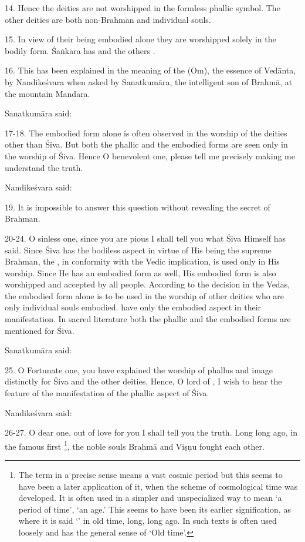 14. Hence the deities are not worshipped in the formless phallic symbol.
The other deities are both non-Brahman and individual souls.

15. In view of their being embodied alone they are worshipped solely in the
bodily form. Śaṅkara has  and the others .

16. This has been explained in the meaning of the  (Om), the essence
of Vedānta, by Nandikeśvara when asked by Sanatkumāra, the intelligent son of
Brahmā, at the mountain Mandara.

Sanatkumāra said:

17-18. The embodied form alone is often observed in the worship of the deities
other than Śiva. But both the phallic and the embodied forms are seen only in
the worship of Śiva. Hence O benevolent one, please tell me precisely making me
understand the truth.

Nandikeśvara said:

19. It is impossible to answer this question without revealing the secret of
Brahman.

20-24. O sinless one, since you are pious I shall tell you what Śiva Himself has
said. Since Śiva has the bodiless aspect in virtue of His being the supreme
Brahman, the , in conformity with the Vedic implication, is
used only in His worship. Since He has an embodied form as well, His embodied
form is also worshipped and accepted by all people. According to the decision in
the Vedas, the embodied form alone is to be used in the worship of other deities
who are only individual souls embodied.  have only the embodied aspect
in their manifestation. In sacred literature both the phallic and the embodied
forms are mentioned for Śiva.

Sanatkumāra said:

25. O Fortunate one, you have explained the worship of phallus and image
distinctly for Śiva and the other deities. Hence, O lord of , I wish
to hear the feature of the manifestation of the phallic aspect of Śiva.

Nandikeśvara said:

26-27. O dear one, out of love for you I shall tell you the truth. Long long ago,
in the famous first \footnote{The term  in a precise sense
means a vast cosmic period but this seems to have been a later application of it,
when the scheme of cosmological time was developed. It is often used in
a simpler and unspecialized way to mean ‘a period of time’, ‘an age.’ This seems
to have been its earlier signification, as where it is said ‘’ in old time, long, long ago. In such texts  is often
used loosely and has the general sense of ‘Old time’.}, the noble souls Brahmā
and Viṣṇu fought each other.

